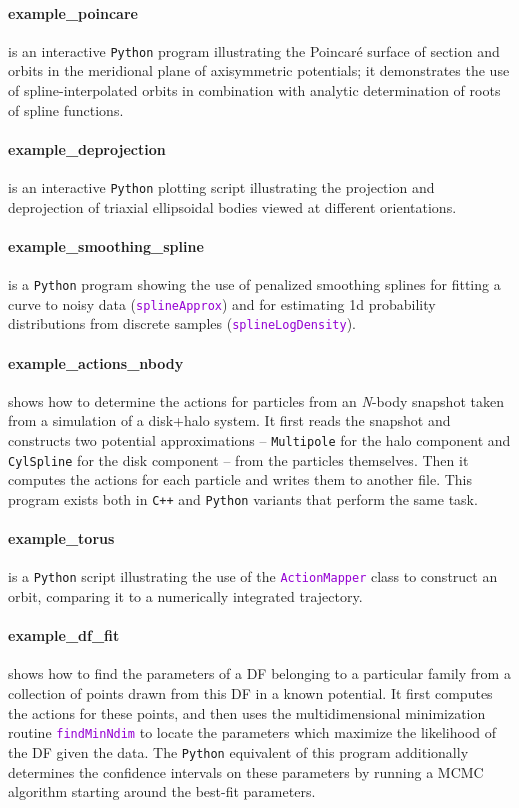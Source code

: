\documentclass[12pt]{article}
\newcommand{\Nbody}{\textsl{N}-body\xspace}
\newcommand{\Cpp}  {\texttt{C++}\xspace}
\newcommand{\Python}{\texttt{Python}\xspace}
\newcommand{\ttt}[1]{\textcolor{darkviolet}{\texttt{#1}}}
\newcommand{\ppp}[1]{\textcolor{darkolive} {\texttt{#1}}}
\let\oldparagraph\paragraph
\renewcommand{\paragraph}[1]{\vspace{-2mm}\oldparagraph{#1}}
\begin{document}
\paragraph{example_poincare} is an interactive \Python program illustrating the Poincar\'e surface of section and orbits in the meridional plane of axisymmetric potentials; it demonstrates the use of spline-interpolated orbits in combination with analytic determination of roots of spline functions.

\paragraph{example_deprojection} is an interactive \Python plotting script illustrating the projection and deprojection of triaxial ellipsoidal bodies viewed at different orientations.

\paragraph{example_smoothing_spline} is a \Python program showing the use of penalized smoothing splines for fitting a curve to noisy data (\ttt{splineApprox}) and for estimating 1d probability distributions from discrete samples (\ttt{splineLogDensity}).

\paragraph{example_actions_nbody} shows how to determine the actions for particles from an \Nbody snapshot taken from a simulation of a disk+halo system. It first reads the snapshot and constructs two potential approximations -- \ppp{Multipole} for the halo component and \ppp{CylSpline} for the disk component -- from the particles themselves. Then it computes the actions for each particle and writes them to another file. This program exists both in \Cpp and \Python variants that perform the same task.

\paragraph{example_torus} is a \Python script illustrating the use of the \ttt{ActionMapper} class to construct an orbit, comparing it to a numerically integrated trajectory.

\paragraph{example_df_fit} shows how to find the parameters of a DF belonging to a particular family from a collection of points drawn from this DF in a known potential. It first computes the actions for these points, and then uses the multidimensional minimization routine \ttt{findMinNdim} to locate the parameters which maximize the likelihood of the DF given the data.
The \Python equivalent of this program additionally determines the confidence intervals on these parameters by running a MCMC algorithm starting around the best-fit parameters.
\end{document}
